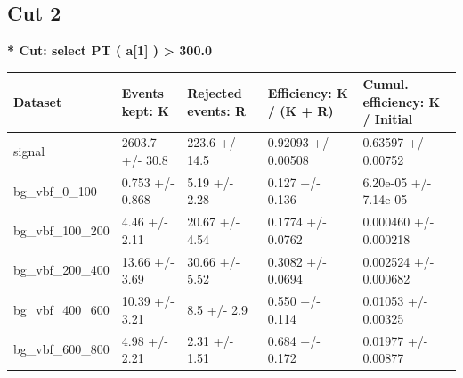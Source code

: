 \documentclass[a4paper, 10pt]{article}
\begin{document}
   \newpage
\subsection{Cut 2}

\textbf{* Cut: select PT ( a[1] ) > 300.0}\\
   \begin{table}[H]
  \begin{center}
    \begin{tabular}{|m{20.0mm}|m{27.0mm}|m{27.0mm}|m{33.0mm}|m{32.0mm}|}
      \hline
      {\cellcolor{yellow}         Dataset}& {\cellcolor{yellow}         Events kept:
          K}& {\cellcolor{yellow}         Rejected events:
          R}& {\cellcolor{yellow}         Efficiency:
          K /\- (K + R)}& {\cellcolor{yellow}         Cumul. efficiency:
          K /\- Initial}\\
      \hline
      {\cellcolor{white}         signal}& {\cellcolor{white}         2603.7 +/\-- 30.8}& {\cellcolor{white}         223.6 +/\-- 14.5}& {\cellcolor{white}         0.92093 +/\-- 0.00508}& {\cellcolor{white}         0.63597 +/\-- 0.00752}\\
      \hline
      {\cellcolor{white}         bg\_vbf\_0\_100}& {\cellcolor{white}         0.753 +/\-- 0.868}& {\cellcolor{white}         5.19 +/\-- 2.28}& {\cellcolor{white}         0.127 +/\-- 0.136}& {\cellcolor{white}         6.20e-05 +/\-- 7.14e-05}\\
      \hline
      {\cellcolor{white}         bg\_vbf\_100\_200}& {\cellcolor{white}         4.46 +/\-- 2.11}& {\cellcolor{white}         20.67 +/\-- 4.54}& {\cellcolor{white}         0.1774 +/\-- 0.0762}& {\cellcolor{white}         0.000460 +/\-- 0.000218}\\
      \hline
      {\cellcolor{white}         bg\_vbf\_200\_400}& {\cellcolor{white}         13.66 +/\-- 3.69}& {\cellcolor{white}         30.66 +/\-- 5.52}& {\cellcolor{white}         0.3082 +/\-- 0.0694}& {\cellcolor{white}         0.002524 +/\-- 0.000682}\\
      \hline
      {\cellcolor{white}         bg\_vbf\_400\_600}& {\cellcolor{white}         10.39 +/\-- 3.21}& {\cellcolor{white}         8.5 +/\-- 2.9}& {\cellcolor{white}         0.550 +/\-- 0.114}& {\cellcolor{white}         0.01053 +/\-- 0.00325}\\
      \hline
      {\cellcolor{white}         bg\_vbf\_600\_800}& {\cellcolor{white}         4.98 +/\-- 2.21}& {\cellcolor{white}         2.31 +/\-- 1.51}& {\cellcolor{white}         0.684 +/\-- 0.172}& {\cellcolor{white}         0.01977 +/\-- 0.00877}\\

\end{tabular}
\end{center}
\end{table}
\end{document}
